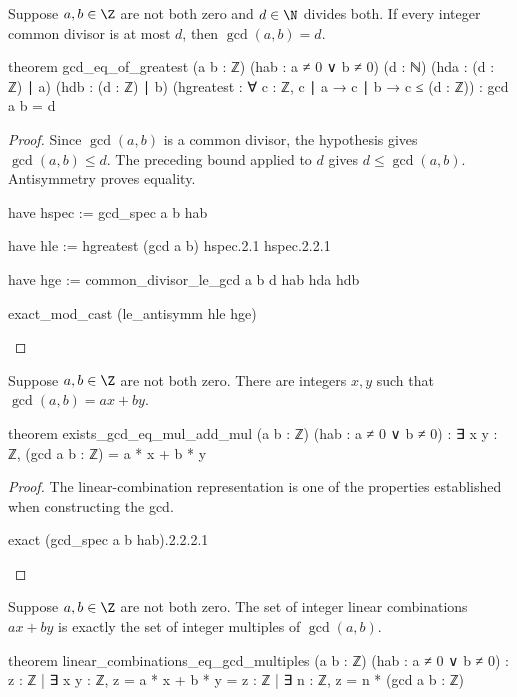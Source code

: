\begin{theorem} \label{nt:thm:gcd-eq-of-greatest}
  Suppose $a,b\in\Z$ are not both zero and $d\in\N$ divides both. If every integer common divisor is at most $d$, then $\gcd(a,b)=d$.

  \begin{lean}
    theorem gcd_eq_of_greatest (a b : ℤ) (hab : a ≠ 0 ∨ b ≠ 0) (d : ℕ)
        (hda : (d : ℤ) ∣ a) (hdb : (d : ℤ) ∣ b)
        (hgreatest : ∀ c : ℤ, c ∣ a → c ∣ b → c ≤ (d : ℤ)) : gcd a b = d
  \end{lean}
\end{theorem}

\begin{proof}
  Since $\gcd(a,b)$ is a common divisor, the hypothesis gives $\gcd(a,b)\le d$. The preceding bound applied to $d$ gives $d\le\gcd(a,b)$. Antisymmetry proves equality.

  \begin{lean}
    have hspec := gcd_spec a b hab

    have hle := hgreatest (gcd a b) hspec.2.1 hspec.2.2.1

    have hge := common_divisor_le_gcd a b d hab hda hdb

    exact_mod_cast (le_antisymm hle hge)
  \end{lean}
\end{proof}

\begin{theorem} \label{nt:thm:bezout}
  Suppose $a,b\in\Z$ are not both zero. There are integers $x,y$ such that $\gcd(a,b)=ax+by$.

  \begin{lean}
    theorem exists_gcd_eq_mul_add_mul (a b : ℤ) (hab : a ≠ 0 ∨ b ≠ 0) :
        ∃ x y : ℤ, (gcd a b : ℤ) = a * x + b * y
  \end{lean}
\end{theorem}

\begin{proof}
  The linear-combination representation is one of the properties established when constructing the gcd.

  \begin{lean}
    exact (gcd_spec a b hab).2.2.2.1
  \end{lean}
\end{proof}

\begin{theorem} \label{nt:thm:gcd-linear-combinations}
  Suppose $a,b\in\Z$ are not both zero. The set of integer linear combinations $ax+by$ is exactly the set of integer multiples of $\gcd(a,b)$.

  \begin{lean}
    theorem linear_combinations_eq_gcd_multiples (a b : ℤ) (hab : a ≠ 0 ∨ b ≠ 0) :
        {z : ℤ | ∃ x y : ℤ, z = a * x + b * y} =
          {z : ℤ | ∃ n : ℤ, z = n * (gcd a b : ℤ)}
  \end{lean}
\end{theorem}

